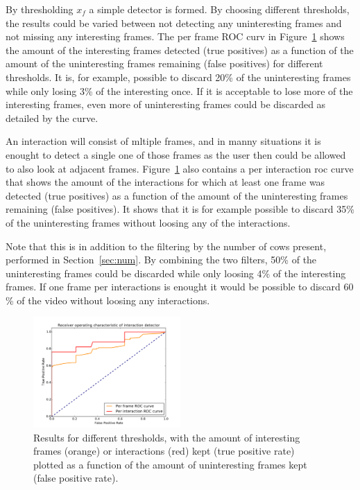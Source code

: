 \documentclass{cta-author}
\begin{document}
By thresholding $x_f$ a simple detector is formed. By choosing different thresholds, the results could be 
varied between not detecting any uninteresting frames and not missing any interesting frames. The per frame 
ROC curv in Figure~\ref{fig:roc} shows the amount of the interesting frames detected (true positives) as a 
function of the amount of the uninteresting frames remaining (false positives) for different thresholds. It 
is, for example, possible to discard 20\% of the uninteresting frames while only losing 3\% of the 
interesting once. If it is acceptable to lose more of the interesting frames, even more of uninteresting 
frames could be discarded as detailed by the curve.

An interaction will consist of mltiple frames, and in manny situations it is enought to detect a single one 
of those frames as the user then could be allowed to also look at adjacent frames. Figure~\ref{fig:roc} also 
contains a per interaction roc curve that shows the amount of the interactions for which at least one frame 
was detected (true positives) as a function of the amount of the uninteresting frames remaining (false 
positives). It shows that it is for example possible to discard 35\% of the uninteresting frames without 
loosing any of the interactions.

Note that this is in addition to the filtering by the number of cows present, performed in 
Section~\ref{sec:num}. By combining the two filters, 50\% of the uninteresting frames could be discarded 
while only loosing 4\% of the interesting frames. If one frame per interactions is enought it would be 
possible to discard 60 \% of the video without loosing any interactions.

\begin{figure}[tb]
\begin{center}
  \includegraphics[width=0.5\textwidth]{roc.pdf}
\end{center}
  \caption{Results for different thresholds, with the amount of interesting frames (orange) or interactions 
(red) kept (true positive rate) plotted as a function of the amount of uninteresting frames kept (false 
positive rate).}
  \label{fig:roc}
\end{figure}
\end{document}
